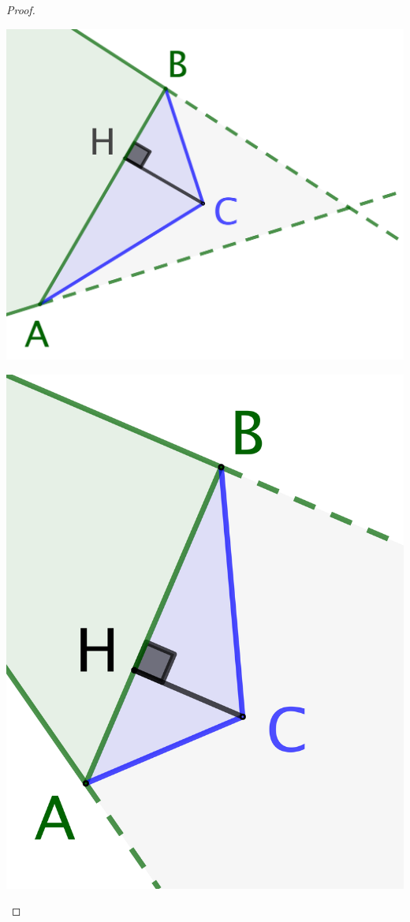 \begin{proof}
\begin{enumerate}
\begin{multicols}{2}
			\includegraphics[scale=.35]{content/polygon/sol-must-be/add-vertex-1.png}

			\includegraphics[scale=.35]{content/polygon/sol-must-be/add-vertex-2.png}
		\end{multicols}


\end{enumerate}
\end{proof}
